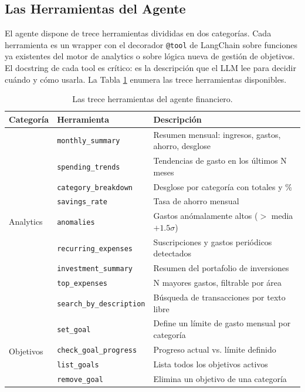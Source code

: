 \subsection{Las Herramientas del Agente}
\label{subsec:herramientas}

El agente dispone de trece herramientas divididas en dos categorías. Cada herramienta es un wrapper con el decorador \texttt{@tool} de LangChain sobre funciones ya existentes del motor de analytics o sobre lógica nueva de gestión de objetivos. El docstring de cada tool es crítico: es la descripción que el LLM lee para decidir cuándo y cómo usarla. La Tabla \ref{tab:tools} enumera las trece herramientas disponibles.

\begin{table}[h]
\centering
\caption{Las trece herramientas del agente financiero.}
\label{tab:tools}
\begin{tabular}{@{}llp{5cm}@{}}
\toprule
\textbf{Categoría} & \textbf{Herramienta} & \textbf{Descripción} \\
\midrule
\multirow{9}{*}{Analytics} & \texttt{monthly\_summary} & Resumen mensual: ingresos, gastos, ahorro, desglose \\
 & \texttt{spending\_trends} & Tendencias de gasto en los últimos N meses \\
 & \texttt{category\_breakdown} & Desglose por categoría con totales y \% \\
 & \texttt{savings\_rate} & Tasa de ahorro mensual \\
 & \texttt{anomalies} & Gastos anómalamente altos ($>$ media $+ 1.5\sigma$) \\
 & \texttt{recurring\_expenses} & Suscripciones y gastos periódicos detectados \\
 & \texttt{investment\_summary} & Resumen del portafolio de inversiones \\
 & \texttt{top\_expenses} & N mayores gastos, filtrable por área \\
 & \texttt{search\_by\_description} & Búsqueda de transacciones por texto libre \\
\midrule
\multirow{4}{*}{Objetivos} & \texttt{set\_goal} & Define un límite de gasto mensual por categoría \\
 & \texttt{check\_goal\_progress} & Progreso actual vs. límite definido \\
 & \texttt{list\_goals} & Lista todos los objetivos activos \\
 & \texttt{remove\_goal} & Elimina un objetivo de una categoría \\
\bottomrule
\end{tabular}
\end{table}

